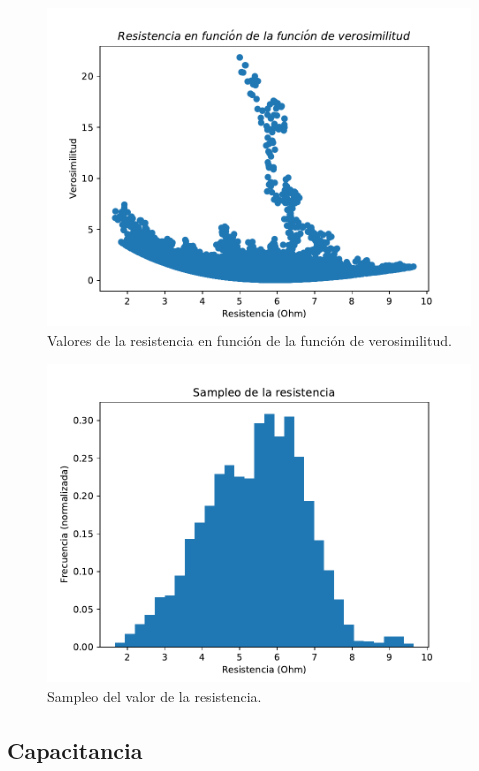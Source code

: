 \documentclass[12pt,letterpaper]{article}
\begin{document}
\begin{figure}[H]
\includegraphics{r_verosimilitud.pdf}
\caption{Valores de la resistencia en función de la función de verosimilitud.}
\centering
\end{figure}

\begin{figure}[H]
\includegraphics{r_hist.pdf}
\caption{Sampleo del valor de la resistencia.}
\centering
\end{figure}

\subsection{Capacitancia}
\end{document}
